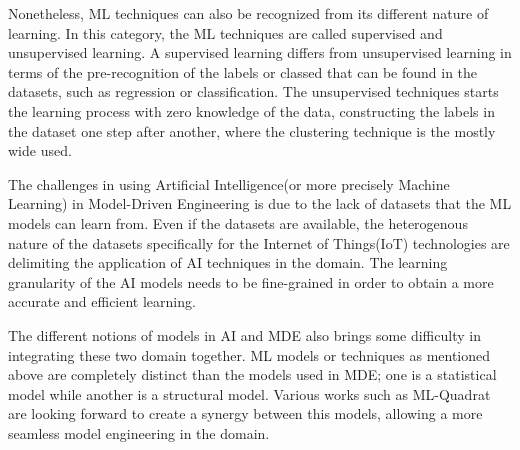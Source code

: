 Nonetheless, ML techniques can also be recognized from its different nature of learning. In this category, the ML techniques are called supervised and unsupervised learning. A supervised learning differs from unsupervised learning in terms of the pre-recognition of the labels or classed that can be found in the datasets, such as regression or classification. The unsupervised techniques starts the learning process with zero knowledge of the data, constructing the labels in the dataset one step after another, where the clustering technique is the mostly wide used. 

The challenges in using Artificial Intelligence(or more precisely Machine Learning) in Model-Driven Engineering is due to the lack of datasets that the ML models can learn from. Even if the datasets are available, the heterogenous nature of the datasets specifically for the Internet of Things(IoT) technologies are delimiting the application of AI techniques in the domain. The learning granularity of the AI models needs to be fine-grained in order to obtain a more accurate and efficient learning.

The different notions of models in AI and MDE also brings some difficulty in integrating these two domain together. ML models or techniques as mentioned above are completely distinct than the models used in MDE; one is a statistical model while another is a structural model. Various works such as ML-Quadrat are looking forward to create a synergy between this models, allowing a more seamless model engineering in the domain.

